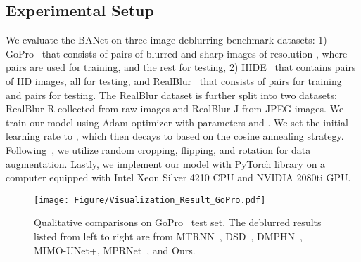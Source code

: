 \subsection{Experimental Setup}
We evaluate the BANet on three image deblurring benchmark datasets: 1) GoPro~\cite{Nah_2017_CVPR} that consists of  pairs of blurred and sharp images of resolution , where  pairs are used for training, and the rest for testing, 2) HIDE~\cite{HAdeblur} that contains  pairs of HD images, all for testing, and RealBlur~\cite{rim_2020_ECCV} that consists of  pairs for training and  pairs for testing. 
The RealBlur dataset is further split into two datasets: RealBlur-R collected from raw images and RealBlur-J from JPEG images.
We train our model using Adam optimizer with parameters  and .
We set the initial learning rate to , which then decays to  based on the cosine annealing strategy.
Following~\cite{MT_2020_ECCV, Yuan_2020_CVPR}, we utilize random cropping, flipping, and rotation for data augmentation. 
Lastly, we implement our model with PyTorch library on a computer equipped with Intel Xeon Silver 4210 CPU and NVIDIA 2080ti GPU.


\begin{figure*}[t!]
\centering
\texttt{[image: Figure/Visualization\_Result\_GoPro.pdf]}
\vspace{-0.1in}
\caption{Qualitative comparisons on GoPro~\cite{Nah_2017_CVPR} test set. The deblurred results listed from left to right are from MTRNN~\cite{MT_2020_ECCV}, DSD~\cite{gao2019dynamic},  DMPHN~\cite{Zhang_2019_CVPR}, MIMO-UNet+\cite{MIMO}, MPRNet~\cite{Zamir_2021_CVPR}, and Ours.}
\label{fig:Visualization_Result_GoPro}
\end{figure*}

